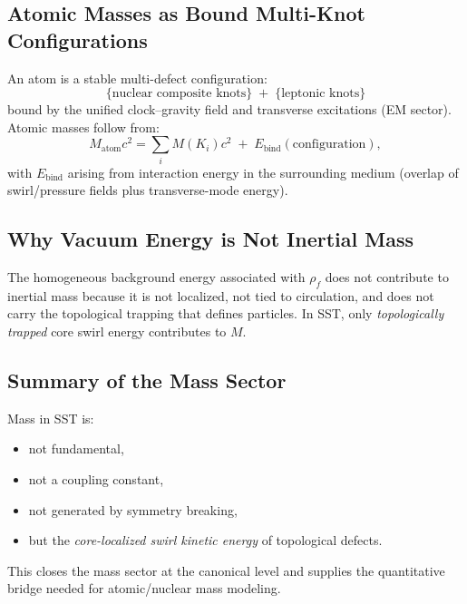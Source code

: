\documentclass[10pt]{article}
\newcommand{\rhof}{\rho_{\!f}}                           %
\begin{document}
    \subsection{Atomic Masses as Bound Multi-Knot Configurations}

        An atom is a stable multi-defect configuration:
        \[
            \{\text{nuclear composite knots}\} \;+\; \{\text{leptonic knots}\}
        \]
        bound by the unified clock--gravity field and transverse excitations (EM sector).
        Atomic masses follow from:
        \begin{equation}
            M_{\text{atom}}c^2
            =
            \sum_i M(K_i)c^2
            \;+\;E_{\text{bind}}(\text{configuration}),
        \end{equation}
        with $E_{\text{bind}}$ arising from interaction energy in the surrounding medium
        (overlap of swirl/pressure fields plus transverse-mode energy).

    \subsection{Why Vacuum Energy is Not Inertial Mass}

        The homogeneous background energy associated with $\rhof$ does not contribute to
        inertial mass because it is not localized, not tied to circulation, and does not
        carry the topological trapping that defines particles. In SST, only
        \emph{topologically trapped} core swirl energy contributes to $M$.

    \subsection{Summary of the Mass Sector}

        Mass in SST is:
        \begin{itemize}
            \item not fundamental,
            \item not a coupling constant,
            \item not generated by symmetry breaking,
            \item but the \emph{core-localized swirl kinetic energy} of topological defects.
        \end{itemize}

        This closes the mass sector at the canonical level and supplies the quantitative
        bridge needed for atomic/nuclear mass modeling.
\end{document}
